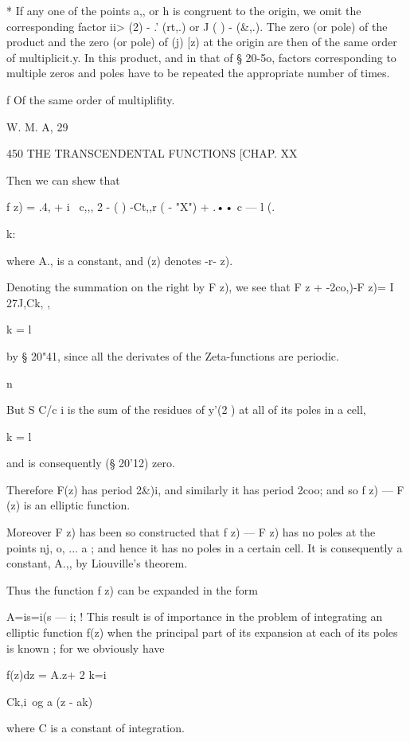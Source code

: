 {* If any one of the points a,, or h is congruent to the origin, we
omit the corresponding factor ii> (2) - .' (rt,.) or J ( ) - (\&,.).
The zero (or pole) of the product and the zero (or pole) of (j) [z) at
the origin are then of the same order of multiplicit.y. In this
product, and in that of § 20-5o, factors corresponding to multiple
zeros and poles have to be repeated the appropriate number of times.

f Of the same order of multiplifity.

W. M. A, 29



450 THE TRANSCENDENTAL FUNCTIONS [CHAP. XX

Then we can shew that

f z) = .4, + i \ c,,, 2 - ( ) -Ct,,r ( - "X") + .•• c — l (.



k:



where A., is a constant, and (z) denotes -r- z).

Denoting the summation on the right by F z), we see that F z +
-2co,)-F z)= I 27J,Ck, ,

k = l

by § 20"41, since all the derivates of the Zeta-functions are
periodic.

n

But S C/c i is the sum of the residues of y'(2 ) at all of its poles
in a cell,

k = l

and is consequently (§ 20'12) zero.

Therefore F(z) has period 2\&)i, and similarly it has period 2coo; and
so f z) — F (z) is an elliptic function.

Moreover F z) has been so constructed that f z) — F z) has no poles at
the points nj, o, ... a ; and hence it has no poles in a certain cell.
It is consequently a constant, A.,, by Liouville's theorem.

Thus the function f z) can be expanded in the form

A=is=i(s — i; ! This result is of importance in the problem of
integrating an elliptic function f(z) when the principal part of its
expansion at each of its poles is known ; for we obviously have



f(z)dz = A.z+ 2 k=i



Ck,i\ og a (z - ak)

where C is a constant of integration.

}
